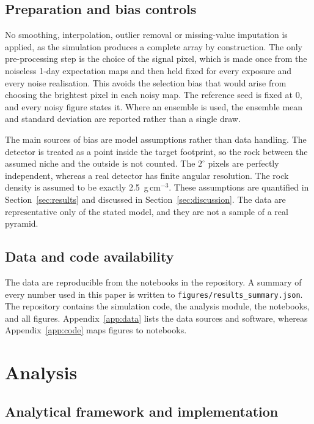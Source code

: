 \documentclass{article}
\begin{document}
\subsection{Preparation and bias controls}

No smoothing, interpolation, outlier removal or missing-value imputation is
applied, as the simulation produces a complete array by construction. The only
pre-processing step is the choice of the signal pixel, which is made once from
the noiseless 1-day expectation maps and then held fixed for every exposure and
every noise realisation. This avoids the selection bias that would arise from
choosing the brightest pixel in each noisy map. The reference seed is fixed at
0, and every noisy figure states it. Where an ensemble is used, the ensemble
mean and standard deviation are reported rather than a single draw.

The main sources of bias are model assumptions rather than data handling. The
detector is treated as a point inside the target footprint, so the rock between
the assumed niche and the outside is not counted. The $2^\circ$ pixels are
perfectly independent, whereas a real detector has finite angular resolution.
The rock density is assumed to be exactly 2.5~g\,cm$^{-3}$. These assumptions
are quantified in Section~\ref{sec:results} and discussed in
Section~\ref{sec:discussion}. The data are representative only of the stated
model, and they are not a sample of a real pyramid.

\subsection{Data and code availability}

The data are reproducible from the notebooks in the repository. A summary of
every number used in this paper is written to
\texttt{figures/results\_summary.json}. The repository contains the simulation
code, the analysis module, the notebooks, and all figures. Appendix~\ref{app:data} lists the data sources and software, whereas
Appendix~\ref{app:code} maps figures to notebooks.


\section{Analysis}
\label{sec:analysis}

\subsection{Analytical framework and implementation}
\end{document}
